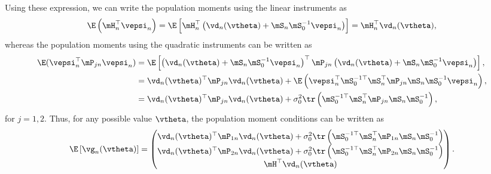 Using these expression, we can write the population moments using the linear instruments as
\begin{equation*}
\E\left(\mH_n^\top\vepsi_n\right) = \E\left[\mH_n^\top\left(\vd_n(\vtheta) + \mS_n\mS_0^{-1}\vepsi_n\right)\right] = \mH^\top_n\vd_n(\vtheta), 
\end{equation*}
%
whereas the population moments using the quadratic instruments can be written as
\begin{equation*}
  \begin{aligned}
   \E(\vepsi_n^\top \mP_{jn}\vepsi_n) & = \E\left[\left(\vd_n(\vtheta) + \mS_n\mS_0^{-1}\vepsi_n\right)^\top\mP_{jn}\left(\vd_n(\vtheta) + \mS_n\mS_0^{-1}\vepsi_n\right)\right], \\
   & = \vd_n(\vtheta)^\top\mP_{jn}\vd_n(\vtheta) +\E\left(\vepsi_n^\top\mS_0^{-1\top}\mS_n^\top\mP_{jn}\mS_n\mS_0^{-1}\vepsi_n\right), \\
   & =  \vd_n(\vtheta)^\top\mP_{jn}\vd_n(\vtheta) + \sigma_0^2\tr\left(\mS_0^{-1\top}\mS_n^\top\mP_{jn}\mS_n\mS_0^{-1}\right), 
  \end{aligned}
\end{equation*}
%
for $j = 1, 2$. Thus, for any possible value $\vtheta$, the population moment conditions can be written as
\begin{equation*}
\E\left[\vg_n(\vtheta)\right]  = \begin{pmatrix}
 \vd_n(\vtheta)^\top\mP_{1n}\vd_n(\vtheta) + \sigma_0^2\tr\left(\mS_0^{-1\top}\mS_n^\top\mP_{1n}\mS_n\mS_0^{-1}\right) \\
  \vd_n(\vtheta)^\top\mP_{2n}\vd_n(\vtheta) + \sigma_0^2\tr\left(\mS_0^{-1\top}\mS_n^\top\mP_{2n}\mS_n\mS_0^{-1}\right) \\
  \mH^\top\vd_n(\vtheta)
                       \end{pmatrix}.  
\end{equation*}

